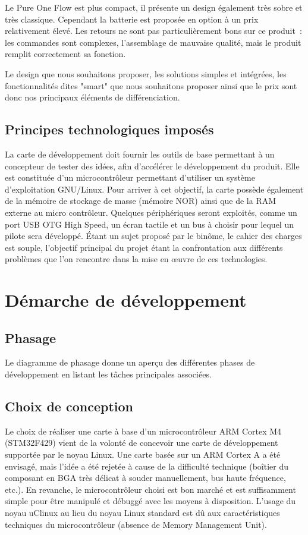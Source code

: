 Le Pure One Flow est plus compact, il présente un design également très sobre et très classique.
Cependant la batterie est proposée en option à un prix relativement élevé.
Les retours ne sont pas particulièrement bons sur ce produit~: les commandes sont complexes, l'assemblage de mauvaise qualité, mais le produit remplit correctement sa fonction.

Le design que nous souhaitons proposer, les solutions simples et intégrées, les fonctionnalités dites "smart" que nous souhaitons proposer ainsi que le prix sont donc nos principaux éléments de différenciation.
        
    \subsection{Principes technologiques imposés}
		La carte de développement doit fournir les outils de base permettant à un concepteur de tester des idées, afin d'accélérer le développement du produit. 
    	Elle est constituée d'un microcontrôleur permettant d'utiliser un système d'exploitation GNU/Linux.
        Pour arriver à cet objectif, la carte possède également de la mémoire de stockage de masse (mémoire NOR) ainsi que de la RAM externe au micro contrôleur. 
        Quelques périphériques seront exploités, comme un port USB OTG High Speed, un écran tactile et un bus à choisir pour lequel un pilote sera développé.
        Étant un sujet proposé par le binôme, le cahier des charges est souple, l'objectif principal du projet étant la confrontation aux différents problèmes que l'on rencontre dans la mise en œuvre de ces technologies.
        
\section{Démarche de développement}

	\subsection{Phasage}   	 
     Le diagramme de phasage donne un aperçu des différentes phases de développement en listant les tâches principales associées.     
     
    \subsection{Choix de conception}
    	Le choix de réaliser une carte à base d'un microcontrôleur ARM Cortex M4 (STM32F429) vient de la volonté de concevoir une carte de développement supportée par le noyau Linux. Une carte basée sur un ARM Cortex A a été envisagé, mais l'idée a été rejetée à cause de la difficulté technique (boîtier du composant en BGA très délicat à souder manuellement, bus haute fréquence, etc.).
        En revanche, le microcontrôleur choisi est bon marché et est suffisamment simple pour être manipulé et débuggé avec les moyens à disposition.
        L'usage du noyau uClinux au lieu du noyau Linux standard est dû aux caractéristiques techniques du microcontrôleur (absence de Memory Management Unit).
       
